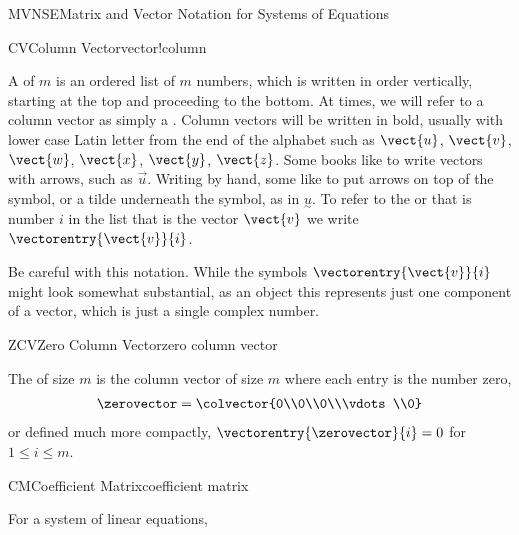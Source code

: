 \begin{subsect}{MVNSE}{Matrix and Vector Notation for Systems of Equations}
%
\begin{definition}{CV}{Column Vector}{vector!column}
\begin{para}A  of  $m$ is an ordered list of $m$ numbers, which is written in order vertically, starting at the top and proceeding to the bottom.  At times, we will refer to a column vector as simply a .  Column vectors will be written in bold, usually with lower case Latin letter from the end of the alphabet such as $\vect{u}$, $\vect{v}$, $\vect{w}$, $\vect{x}$, $\vect{y}$, $\vect{z}$.  Some books like to write vectors with arrows, such as $\vec{u}$.  Writing by hand, some like to put arrows on top of the symbol, or a tilde underneath the symbol, as in $\underset{\sim}{\textstyle u}$.  To refer to the  or  that is number $i$ in the list that is the vector $\vect{v}$ we write $\vectorentry{\vect{v}}{i}$.\end{para}
\end{definition}
%
\begin{para}Be careful with this notation.  While the symbols $\vectorentry{\vect{v}}{i}$ might look somewhat substantial, as an object this represents just one component of a vector, which is just a single complex number.\end{para}
%
\begin{definition}{ZCV}{Zero Column Vector}{zero column vector}
\begin{para}The  of size $m$ is the column vector of size $m$ where each entry is the number zero,
%
\begin{align*}
\zerovector=
\colvector{0\\0\\0\\\vdots\\0}
\end{align*}
%
or defined much more compactly, $\vectorentry{\zerovector}{i}=0$ for $1\leq i\leq m$.\end{para}
\end{definition}
%
%
\begin{definition}{CM}{Coefficient Matrix}{coefficient matrix}
\begin{para}For a system of linear equations,
\begin{align*}

\end{align*}
\end{para}
\end{definition}
\end{subsect}
